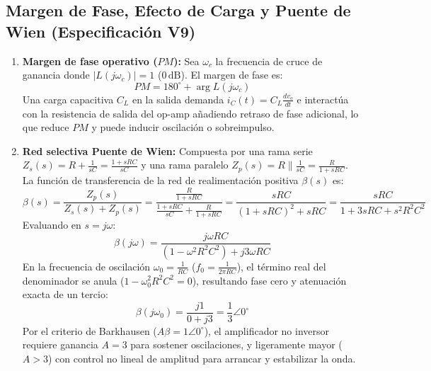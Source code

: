 \documentclass[11pt, a4paper]{article}
\begin{document}
\subsection{Margen de Fase, Efecto de Carga y Puente de Wien (Especificación V9)}
\begin{enumerate}[noitemsep]
    \item \textbf{Margen de fase operativo ($PM$):} Sea $\omega_c$ la frecuencia de cruce de ganancia donde $|L(j\omega_c)| = 1$ ($0\,\text{dB}$). El margen de fase es:
    \begin{equation}
        PM = 180^\circ + \arg L(j\omega_c)
    \end{equation}
    Una carga capacitiva $C_L$ en la salida demanda $i_C(t) = C_L \frac{dv_o}{dt}$ e interactúa con la resistencia de salida del op-amp añadiendo retraso de fase adicional, lo que reduce $PM$ y puede inducir oscilación o sobreimpulso.
    \item \textbf{Red selectiva Puente de Wien:} Compuesta por una rama serie $Z_s(s) = R + \frac{1}{sC} = \frac{1+sRC}{sC}$ y una rama paralelo $Z_p(s) = R \parallel \frac{1}{sC} = \frac{R}{1+sRC}$. La función de transferencia de la red de realimentación positiva $\beta(s)$ es:
    \begin{equation}
        \beta(s) = \frac{Z_p(s)}{Z_s(s) + Z_p(s)} = \frac{\frac{R}{1+sRC}}{\frac{1+sRC}{sC} + \frac{R}{1+sRC}} = \frac{sRC}{(1 + sRC)^2 + sRC} = \frac{sRC}{1 + 3sRC + s^2 R^2 C^2}
    \end{equation}
    Evaluando en $s = j\omega$:
    \begin{equation}
        \beta(j\omega) = \frac{j\omega RC}{(1 - \omega^2 R^2 C^2) + j3\omega RC}
    \end{equation}
    En la frecuencia de oscilación $\omega_0 = \frac{1}{RC}$ ($f_0 = \frac{1}{2\pi RC}$), el término real del denominador se anula ($1 - \omega_0^2 R^2 C^2 = 0$), resultando fase cero y atenuación exacta de un tercio:
    \begin{equation}
        \beta(j\omega_0) = \frac{j1}{0 + j3} = \frac{1}{3} \angle 0^\circ
    \end{equation}
    Por el criterio de Barkhausen ($A\beta = 1\angle 0^\circ$), el amplificador no inversor requiere ganancia $A = 3$ para sostener oscilaciones, y ligeramente mayor ($A > 3$) con control no lineal de amplitud para arrancar y estabilizar la onda.
\end{enumerate}
\end{document}
